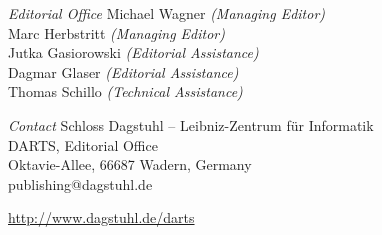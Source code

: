\documentclass[a4paper,UKenglish]{dartsmaster}
\begin{document}
\begin{publicationinfo}

\vfill


\emph{Editorial Office}\newline
Michael Wagner \emph{(Managing Editor)}\\
Marc Herbstritt \emph{(Managing Editor)}\\
Jutka Gasiorowski \emph{(Editorial Assistance)}\\
Dagmar Glaser \emph{(Editorial Assistance)}\\
Thomas Schillo \emph{(Technical Assistance)}

\bigskip
\emph{Contact}\newline
Schloss Dagstuhl -- Leibniz-Zentrum f\"ur Informatik\\
DARTS, Editorial Office\\
Oktavie-Allee, 66687 Wadern, Germany\\ 
publishing@dagstuhl.de


\bigskip

\url{http://www.dagstuhl.de/darts}
 
 \thispagestyle{empty}
 \onecolumn

\newpage

\end{publicationinfo}


\end{document}
